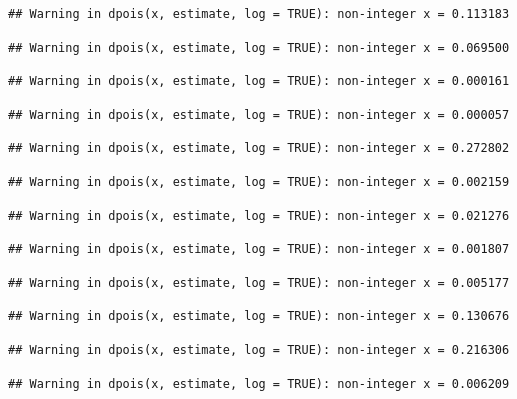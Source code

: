 \documentclass[]{article}
\begin{document}
\begin{verbatim}
## Warning in dpois(x, estimate, log = TRUE): non-integer x = 0.113183
\end{verbatim}

\begin{verbatim}
## Warning in dpois(x, estimate, log = TRUE): non-integer x = 0.069500
\end{verbatim}

\begin{verbatim}
## Warning in dpois(x, estimate, log = TRUE): non-integer x = 0.000161
\end{verbatim}

\begin{verbatim}
## Warning in dpois(x, estimate, log = TRUE): non-integer x = 0.000057
\end{verbatim}

\begin{verbatim}
## Warning in dpois(x, estimate, log = TRUE): non-integer x = 0.272802
\end{verbatim}

\begin{verbatim}
## Warning in dpois(x, estimate, log = TRUE): non-integer x = 0.002159
\end{verbatim}

\begin{verbatim}
## Warning in dpois(x, estimate, log = TRUE): non-integer x = 0.021276
\end{verbatim}

\begin{verbatim}
## Warning in dpois(x, estimate, log = TRUE): non-integer x = 0.001807
\end{verbatim}

\begin{verbatim}
## Warning in dpois(x, estimate, log = TRUE): non-integer x = 0.005177
\end{verbatim}

\begin{verbatim}
## Warning in dpois(x, estimate, log = TRUE): non-integer x = 0.130676
\end{verbatim}

\begin{verbatim}
## Warning in dpois(x, estimate, log = TRUE): non-integer x = 0.216306
\end{verbatim}

\begin{verbatim}
## Warning in dpois(x, estimate, log = TRUE): non-integer x = 0.006209
\end{verbatim}
\end{document}
